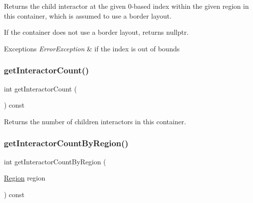 Returns the child interactor at the given 0-\/based index within the given region in this container, which is assumed to use a border layout. 

If the container does not use a border layout, returns nullptr. 
\begin{DoxyExceptions}{Exceptions}
{\em Error\+Exception} & if the index is out of bounds \\
\hline
\end{DoxyExceptions}
\mbox{\label{classGContainer_a789affbf8e89e65e3afd63cc626f5a81}} 
\subsubsection{\texorpdfstring{get\+Interactor\+Count()}{getInteractorCount()}}
{\footnotesize\ttfamily int get\+Interactor\+Count (\begin{DoxyParamCaption}{ }\end{DoxyParamCaption}) const\hspace{0.3cm}{\ttfamily [virtual]}}



Returns the number of children interactors in this container. 

\mbox{\label{classGContainer_a668fe9a4efc31fa065ded79c0e5eab64}} 
\subsubsection{\texorpdfstring{get\+Interactor\+Count\+By\+Region()}{getInteractorCountByRegion()}\hspace{0.1cm}{\footnotesize\ttfamily [1/2]}}
{\footnotesize\ttfamily int get\+Interactor\+Count\+By\+Region (\begin{DoxyParamCaption}\item[{\mbox{\hyperlink{classGContainer_a81a01a86de31071a92e6cce0bab9bc4b}{Region}}}]{region }\end{DoxyParamCaption}) const\hspace{0.3cm}{\ttfamily [virtual]}}



